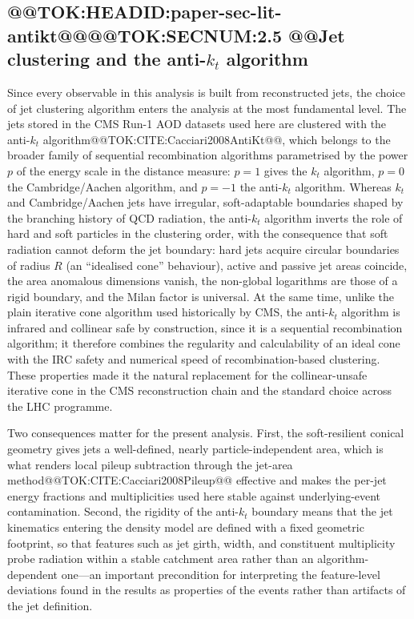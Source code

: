 \documentclass[11pt]{article}
\begin{document}
\subsection{@@TOK:HEADID:paper-sec-lit-antikt@@@@TOK:SECNUM:2.5 @@Jet clustering and the anti-$k_t$ algorithm}

Since every observable in this analysis is built from reconstructed jets, the choice of jet clustering algorithm enters the analysis at the most fundamental level. The jets stored in the CMS Run-1 AOD datasets used here are clustered with the anti-$k_t$ algorithm@@TOK:CITE:Cacciari2008AntiKt@@, which belongs to the broader family of sequential recombination algorithms parametrised by the power $p$ of the energy scale in the distance measure: $p=1$ gives the $k_t$ algorithm, $p=0$ the Cambridge/Aachen algorithm, and $p=-1$ the anti-$k_t$ algorithm. Whereas $k_t$ and Cambridge/Aachen jets have irregular, soft-adaptable boundaries shaped by the branching history of QCD radiation, the anti-$k_t$ algorithm inverts the role of hard and soft particles in the clustering order, with the consequence that soft radiation cannot deform the jet boundary: hard jets acquire circular boundaries of radius $R$ (an ``idealised cone'' behaviour), active and passive jet areas coincide, the area anomalous dimensions vanish, the non-global logarithms are those of a rigid boundary, and the Milan factor is universal. At the same time, unlike the plain iterative cone algorithm used historically by CMS, the anti-$k_t$ algorithm is infrared and collinear safe by construction, since it is a sequential recombination algorithm; it therefore combines the regularity and calculability of an ideal cone with the IRC safety and numerical speed of recombination-based clustering. These properties made it the natural replacement for the collinear-unsafe iterative cone in the CMS reconstruction chain and the standard choice across the LHC programme.

Two consequences matter for the present analysis. First, the soft-resilient conical geometry gives jets a well-defined, nearly particle-independent area, which is what renders local pileup subtraction through the jet-area method@@TOK:CITE:Cacciari2008Pileup@@ effective and makes the per-jet energy fractions and multiplicities used here stable against underlying-event contamination. Second, the rigidity of the anti-$k_t$ boundary means that the jet kinematics entering the density model are defined with a fixed geometric footprint, so that features such as jet girth, width, and constituent multiplicity probe radiation within a stable catchment area rather than an algorithm-dependent one---an important precondition for interpreting the feature-level deviations found in the results as properties of the events rather than artifacts of the jet definition.
\end{document}
